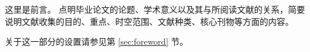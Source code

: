 \begin{foreword}
    这里是前言。
    点明毕业论文的论题、学术意义以及其与所阅读文献的关系，简要说明文献收集的目的、重点、时空范围、文献种类、核心刊物等方面的内容。

    关于这一部分的设置请参见第 \ref{sec:foreword} 节。
\end{foreword}

